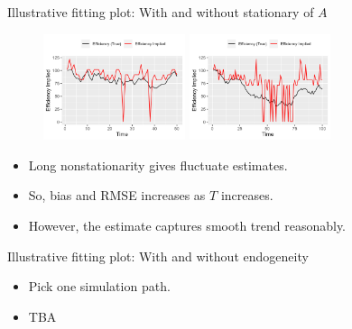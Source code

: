 \documentclass[aspectratio=169]{beamer}
\begin{document}
\begin{frame}{Illustrative fitting plot: With and without stationary of $A$}
\begin{figure}[!ht]
  \begin{center}

  \includegraphics[width = 0.37\textwidth]
  {figuretable/illustrative_plot_implied_efficiency_num_time_50_cobb_douglas_0.3_AR0_I1.png}
  \includegraphics[width = 0.37\textwidth]
  {figuretable/illustrative_plot_implied_efficiency_num_time_100_cobb_douglas_0.3_AR0_I1.png}
  \end{center}
  \footnotesize
\end{figure} 
\begin{itemize}
    \item Long nonstationarity gives fluctuate estimates.
    \item So, bias and RMSE increases as $T$ increases. 
    \item However, the estimate captures smooth trend reasonably.
\end{itemize}
\end{frame}

\begin{frame}{Illustrative fitting plot: With and without endogeneity}

\begin{itemize}
    \item Pick one simulation path. 
    \item TBA
\end{itemize}
\end{frame}
\end{document}

